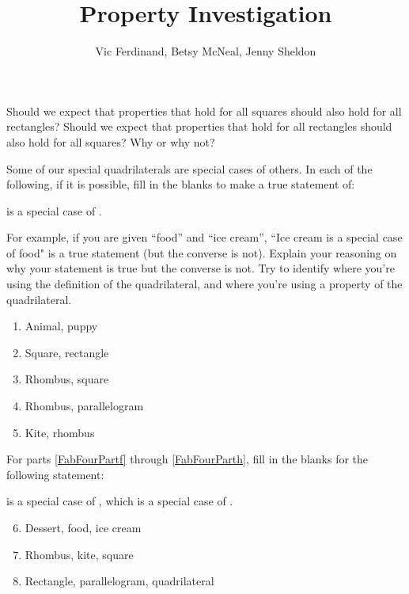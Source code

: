 \documentclass{ximera}
\title{Property Investigation}
\author{Vic Ferdinand, Betsy McNeal, Jenny Sheldon}
\begin{document}
\begin{abstract}\end{abstract}
\maketitle



\begin{problem} Should we expect that properties that hold for all squares should also hold for all rectangles?  Should we expect that properties that hold for all rectangles should also hold for all squares?  Why or why not? 
\end{problem}



\begin{problem} \label{PropInv2}
Some of our special quadrilaterals are special cases of others.  In each of the following, if it is possible, fill in the blanks to make a true statement of:

\begin{center} \underline{\hspace{1in}} is a special case of \underline{\hspace{1in}}. \end{center}

For example, if you are given ``food'' and ``ice cream'', ``Ice cream is a special case of food" is a true statement (but the converse is not).  Explain your reasoning on why your statement is true but the converse is not.  Try to identify where you're using the definition of the quadrilateral, and where you're using a property of the quadrilateral.
\begin{enumerate}
\item  Animal, puppy
\item  Square, rectangle
\item Rhombus, square
\item  Rhombus, parallelogram
\item  Kite, rhombus
\end{enumerate}

For parts \ref{FabFourPartf} through \ref{FabFourParth}, fill in the blanks for the following statement:

\begin{center} \underline{\hspace{0.5in}} is a special case of \underline{\hspace{0.5in}}, which is a special case of \underline{\hspace{0.5in}}. \end{center}

\begin{enumerate}
\setcounter{enumi}{5}
    \item Dessert, food, ice cream \label{FabFourPartf}
    \item  Rhombus, kite, square
    \item Rectangle, parallelogram, quadrilateral \label{FabFourParth}
\end{enumerate}
\end{problem}
\end{document}
